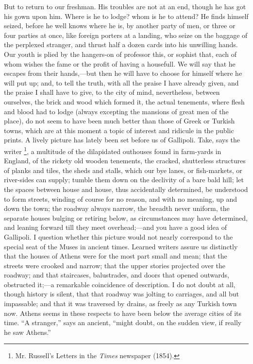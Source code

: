 But to return to our freshman. His troubles are not at an end,
though he has got his gown upon him. Where is he to lodge? whom is he
to attend? He finds himself seized, before he well knows where he is,
by another party of men, or three or four parties at once, like
foreign porters at a landing, who seize on the baggage of the
perplexed stranger, and thrust half a dozen cards into his unwilling
hands. Our youth is plied by the hangers-on of professor this, or
sophist that, each of whom wishes the fame or the profit of having a
housefull. We will say that he escapes from their hands,—but then he
will have to choose for himself where he will put up; and, to tell the
truth, with all the praise I have already given, and the praise I
shall have to give, to the city of mind, nevertheless, between
ourselves, the brick and wood which formed it, the actual tenements,
where flesh and blood had to lodge (always excepting the mansions of
great men of the place), do not seem to have been much better than
those of Greek or Turkish towns, which are at this moment a topic of
interest and ridicule in the public prints. A lively picture has
lately been set before us of Gallipoli. Take, says the writer \footnote{Mr. Russell's Letters in the \emph{Times} newspaper (1854).}, a multitude of the dilapidated outhouses found in farm-yards
in England, of the rickety old wooden tenements, the cracked,
shutterless structures of planks and tiles, the sheds and stalls,
which our bye lanes, or fish-markets, or river-sides can supply;
tumble them down on the declivity of a bare bald hill; let the spaces
between house and house, thus accidentally determined, be understood
to form streets, winding of course for no reason, and with no
meaning, up and down the town; the roadway always narrow, the breadth
never uniform, the separate houses bulging or retiring below, as
circumstances may have determined, and leaning forward till they meet
overhead;—and you have a good idea of Gallipoli. I question whether
this picture would not nearly correspond to the special seat of the
Muses in ancient times. Learned writers assure us distinctly that the
houses of Athens were for the most part small and mean; that the
streets were crooked and narrow; that the upper stories projected over
the roadway; and that staircases, balustrades, and doors that opened
outwards, obstructed it;—a remarkable coincidence of description. I
do not doubt at all, though history is silent, that that roadway was
jolting to carriages, and all but impassable; and that it was
traversed by drains, as freely as any Turkish town now. Athens seems
in these respects to have been below the average cities of its time.
``A stranger,'' says an ancient, ``might doubt, on the
sudden view, if really he saw Athens.''

